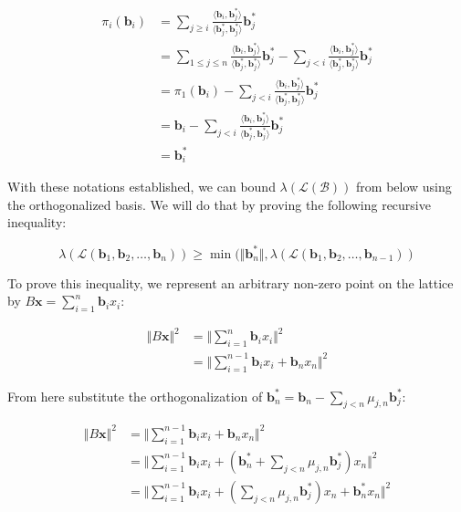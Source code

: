 \documentclass[letterpaper,12pt]{article}
\begin{document}
$$
\begin{aligned}
\pi_i(\mathbf{b}_i) &= \sum_{j\geq i}\frac{\langle \mathbf{b}_i, \mathbf{b}_j^\ast\rangle}{\langle \mathbf{b}_j^\ast, \mathbf{b}_j^\ast \rangle}\mathbf{b}_j^\ast \\
&= \sum_{1 \leq j \leq n}\frac{\langle \mathbf{b}_i, \mathbf{b}_j^\ast\rangle}{\langle \mathbf{b}_j^\ast, \mathbf{b}_j^\ast \rangle}\mathbf{b}_j^\ast  - \sum_{j < i}\frac{\langle \mathbf{b}_i, \mathbf{b}_j^\ast\rangle}{\langle \mathbf{b}_j^\ast, \mathbf{b}_j^\ast \rangle}\mathbf{b}_j^\ast \\
&= \pi_1(\mathbf{b}_i) - \sum_{j < i}\frac{\langle \mathbf{b}_i, \mathbf{b}_j^\ast\rangle}{\langle \mathbf{b}_j^\ast, \mathbf{b}_j^\ast \rangle}\mathbf{b}_j^\ast \\
&= \mathbf{b}_i - \sum_{j < i}\frac{\langle \mathbf{b}_i, \mathbf{b}_j^\ast\rangle}{\langle \mathbf{b}_j^\ast, \mathbf{b}_j^\ast \rangle}\mathbf{b}_j^\ast \\
&= \mathbf{b}_i^\ast
\end{aligned}
$$

With these notations established, we can bound $\lambda(\mathcal{L(B)})$ from below using the orthogonalized basis. We will do that by proving the following recursive inequality:

$$
\lambda(\mathcal{L}(\mathbf{b}_1, \mathbf{b}_2, \ldots, \mathbf{b}_n)) \geq \min (\Vert \mathbf{b}_n^\ast \Vert, \lambda(\mathcal{L}(\mathbf{b}_1, \mathbf{b}_2, \ldots, \mathbf{b}_{n-1}))
$$

To prove this inequality, we represent an arbitrary non-zero point on the lattice by $B\mathbf{x} = \sum_{i=1}^n\mathbf{b}_i x_i$:

$$
\begin{aligned}
\Vert B\mathbf{x} \Vert^2 &= \Vert \sum_{i=1}^n\mathbf{b}_i x_i \Vert^2 \\
&= \Vert \sum_{i=1}^{n-1}\mathbf{b}_ix_i + \mathbf{b}_nx_n \Vert^2
\end{aligned}
$$

From here substitute the orthogonalization of $\mathbf{b}_n^\ast = \mathbf{b}_n - \sum_{j<n}\mu_{j, n} \mathbf{b}_j^\ast$:

$$
\begin{aligned}
\Vert B\mathbf{x} \Vert^2 &= \Vert \sum_{i=1}^{n-1}\mathbf{b}_ix_i + \mathbf{b}_nx_n \Vert^2 \\
&= \Vert \sum_{i=1}^{n-1}\mathbf{b}_ix_i + (\mathbf{b}_n^* + \sum_{j<n}\mu_{j, n}\mathbf{b}_j^\ast)x_n \Vert^2 \\
&= \Vert \sum_{i=1}^{n-1}\mathbf{b}_ix_i + (\sum_{j<n}\mu_{j, n}\mathbf{b}_j^\ast) x_n  + \mathbf{b}_n^\ast x_n\Vert^2
\end{aligned}
$$
\end{document}

